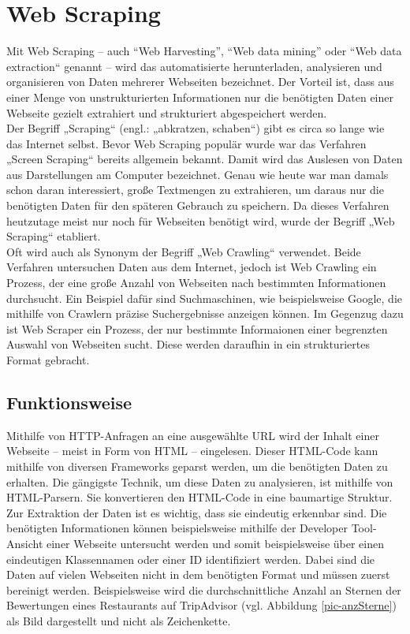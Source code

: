 \documentclass[a4paper,oneside,12pt]{report}
\begin{document}
			
		\section{Web Scraping}
		
			Mit Web Scraping – auch “Web Harvesting”, “Web data mining” oder “Web data extraction“ genannt – wird das automatisierte herunterladen, analysieren und organisieren von Daten mehrerer Webseiten bezeichnet. Der Vorteil ist, dass aus einer Menge von unstrukturierten Informationen nur die benötigten Daten einer Webseite gezielt extrahiert und strukturiert abgespeichert werden. \cite{bib-webscraping}
			\\			
			Der Begriff „Scraping“ (engl.: „abkratzen, schaben“) gibt es circa so lange wie das Internet selbst. Bevor Web Scraping populär wurde war das Verfahren „Screen Scraping“ bereits allgemein bekannt. Damit wird das Auslesen von Daten aus Darstellungen am Computer bezeichnet. Genau wie heute war man damals schon daran interessiert, große Textmengen zu extrahieren, um daraus nur die benötigten Daten für den späteren Gebrauch zu speichern. Da dieses Verfahren heutzutage meist nur noch für Webseiten benötigt wird, wurde der Begriff „Web Scraping“ etabliert. \cite{bib-webscraping}
			\\
			Oft wird auch als Synonym der Begriff „Web Crawling“ verwendet. Beide Verfahren untersuchen Daten aus dem Internet, jedoch ist Web Crawling ein Prozess, der eine große Anzahl von Webseiten nach bestimmten Informationen durchsucht. Ein Beispiel dafür sind Suchmaschinen, wie beispielsweise Google, die mithilfe von Crawlern präzise Suchergebnisse anzeigen können. Im Gegenzug dazu ist Web Scraper ein Prozess, der nur bestimmte Informaionen einer begrenzten Auswahl von Webseiten sucht. Diese werden daraufhin in ein strukturiertes Format gebracht. \cite{bib-articlewebscraping}
			
			
			\subsection{Funktionsweise}
			
				Mithilfe von HTTP-Anfragen an eine ausgewählte URL wird der Inhalt einer Webseite – meist in Form von HTML – eingelesen. Dieser HTML-Code kann mithilfe von diversen Frameworks geparst werden, um die benötigten Daten zu erhalten. Die gängigste Technik, um diese Daten zu analysieren, ist mithilfe von HTML-Parsern. Sie konvertieren den HTML-Code in eine baumartige Struktur.  \cite{bib-scrapehero}
				\\
				Zur Extraktion der Daten ist es wichtig, dass sie eindeutig erkennbar sind. Die benötigten Informationen können beispielsweise mithilfe der Developer Tool-Ansicht einer Webseite untersucht werden und somit beispielsweise über einen eindeutigen Klassennamen oder einer ID identifiziert werden. Dabei sind die Daten auf vielen Webseiten nicht in dem benötigten Format und müssen zuerst bereinigt werden. Beispielsweise wird die durchschnittliche Anzahl an Sternen der Bewertungen eines Restaurants auf TripAdvisor (vgl. Abbildung \ref{pic-anzSterne}) als Bild dargestellt und nicht als Zeichenkette. \cite{bib-scrapehero}
				
\end{document}
